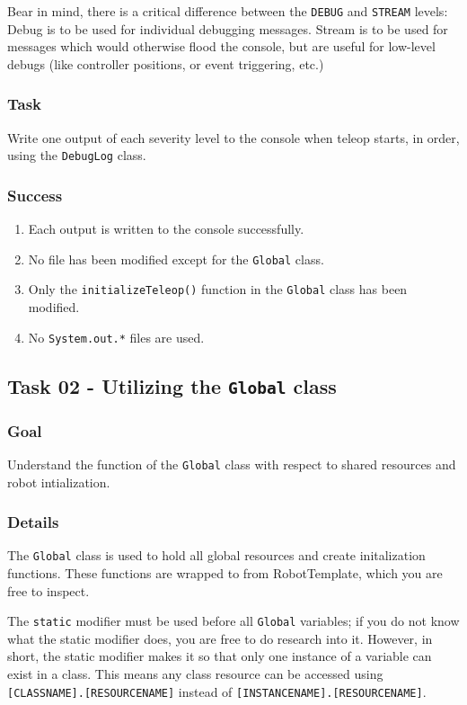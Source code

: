 \documentclass[a4paper]{article}
\begin{document}
Bear in mind, there is a critical difference between the \lstinline{DEBUG} and \lstinline{STREAM} levels: Debug is to be used for individual debugging messages. Stream is to be used for messages which would otherwise flood the console, but are useful for low-level debugs (like controller positions, or event triggering, etc.)
\subsubsection{Task} Write one output of each severity level to the console when teleop starts, in order, using the \lstinline{DebugLog} class.
\subsubsection{Success} \begin{enumerate}\item{Each output is written to the console successfully.}\item{No file has been modified except for the \lstinline{Global} class.}\item{Only the \lstinline{initializeTeleop()} function in the \lstinline{Global} class has been modified.}\item{No \lstinline{System.out.*} files are used.}\end{enumerate}

\subsection{Task 02 - Utilizing the \lstinline{Global} class}
\subsubsection{Goal} Understand the function of the \lstinline{Global} class with respect to shared resources and robot intialization.
\subsubsection{Details} The \lstinline{Global} class is used to hold all global resources and create initalization functions. These functions are wrapped to from RobotTemplate, which you are free to inspect.

The \lstinline{static} modifier must be used before all \lstinline{Global} variables; if you do not know what the static modifier does, you are free to do research into it. However, in short, the static modifier makes it so that only one instance of a variable can exist in a class. This means any class resource can be accessed using \lstinline{[CLASSNAME].[RESOURCENAME]} instead of \lstinline{[INSTANCENAME].[RESOURCENAME]}.
\end{document}
